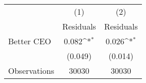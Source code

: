 {
\def\sym#1{\ifmmode^{#1}\else\(^{#1}\)\fi}
\begin{tabular}{l*{2}{c}}
\hline\hline
                    &\multicolumn{1}{c}{(1)}&\multicolumn{1}{c}{(2)}\\
                    &\multicolumn{1}{c}{Residuals}&\multicolumn{1}{c}{Residuals}\\
\hline
Better CEO          &       0.082\sym{*}  &       0.026\sym{*}  \\
                    &     (0.049)         &     (0.014)         \\
\hline
Observations        &       30030         &       30030         \\
\hline\hline
\end{tabular}
}
